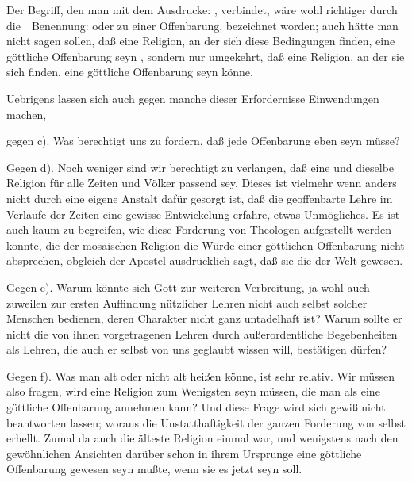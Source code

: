 \begin{aufza}
\item Der Begriff, den man mit dem Ausdrucke: , verbindet, wäre wohl richtiger durch die~\ Benennung:  oder  zu einer Offenbarung, bezeichnet worden; auch hätte man nicht sagen sollen, daß eine Religion, an der sich diese Bedingungen finden, eine göttliche Offenbarung seyn , sondern nur umgekehrt, daß eine Religion, an der sie sich  finden, eine göttliche Offenbarung  seyn könne.
\item Uebrigens lassen sich auch gegen manche dieser Erfordernisse Einwendungen machen, \zB\ 
\begin{aufzb}
\item[gegen c).] Was berechtigt uns zu fordern, daß jede Offenbarung eben  seyn müsse?
\item[Gegen d).] Noch weniger sind wir berechtigt zu verlangen, daß eine und dieselbe Religion für alle Zeiten und Völker passend sey. Dieses ist vielmehr wenn anders nicht durch eine eigene Anstalt dafür gesorgt ist, daß die geoffenbarte Lehre im Verlaufe der Zeiten eine gewisse Entwickelung erfahre, etwas Unmögliches.\RWfootnote{%
	S.~\RWparnr{14} des III.~Hauptstückes.}
Es ist auch kaum zu begreifen, wie diese Forderung von Theologen aufgestellt werden konnte, die der mosaischen Religion die Würde einer göttlichen Offenbarung nicht absprechen, obgleich der Apostel ausdrücklich sagt, daß sie die  der Welt gewesen.
\item[Gegen e).] Warum könnte sich Gott zur weiteren Verbreitung, ja wohl auch zuweilen zur ersten Auffindung nützlicher Lehren nicht auch selbst solcher Menschen bedienen, deren Charakter nicht ganz untadelhaft ist? Warum sollte er nicht die von ihnen vorgetragenen Lehren durch außerordentliche Begebenheiten als Lehren, die auch er selbst von uns geglaubt wissen will, bestätigen dürfen?
\item[Gegen f).] Was man alt oder nicht alt heißen könne, ist sehr relativ. Wir müssen also fragen, \RWbet{wie alt} wird eine Religion zum Wenigsten seyn müssen, die man als eine göttliche Offenbarung annehmen kann? Und diese Frage wird sich gewiß nicht beantworten lassen; woraus die Unstatthaftigkeit der ganzen Forderung von selbst erhellt. Zumal da auch die älteste Religion einmal  war, und wenigstens nach den gewöhnlichen Ansichten darüber schon in ihrem Ursprunge eine göttliche Offenbarung gewesen seyn mußte, wenn sie es jetzt seyn soll.

\end{aufzb}
\end{aufza}
